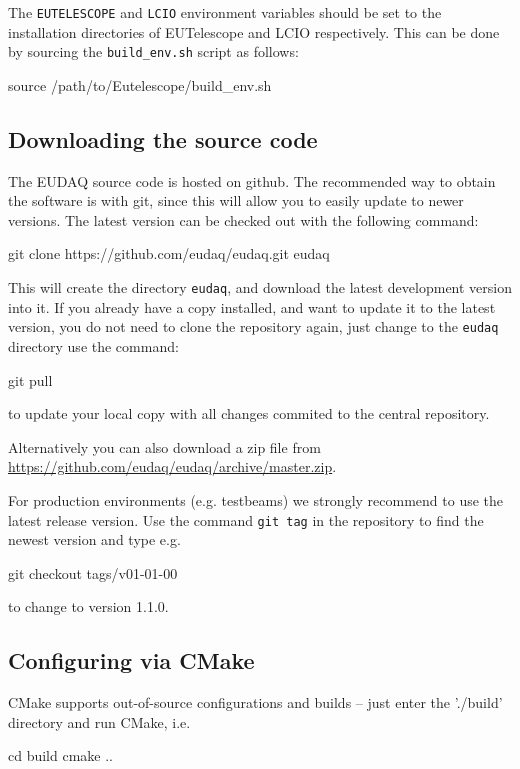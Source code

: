 The \texttt{EUTELESCOPE} and \texttt{LCIO} environment variables should be set to the
installation directories of EUTelescope and LCIO respectively.
This can be done by sourcing the \texttt{build\_env.sh} script as follows:
\begin{listing}[mybash]
source /path/to/Eutelescope/build_env.sh
\end{listing}

\subsection{Downloading the source code}
The EUDAQ source code is hosted on github. The recommended way to obtain the software is with git,
since this will allow you to easily update to newer versions.
The latest version can be checked out with the following command:
\begin{listing}[mybash]
git clone https://github.com/eudaq/eudaq.git eudaq
\end{listing}

This will create the directory \texttt{eudaq}, and download the latest
development version into it. 
If you already have a copy installed, and want to update it to the
latest version, you do not need to clone the repository again, just change to the \texttt{eudaq} directory use the command:
\begin{listing}[mybash]
git pull
\end{listing}
to update your local copy with all changes commited to the central repository.

Alternatively you can also download a zip file from
\url{https://github.com/eudaq/eudaq/archive/master.zip}.

For production environments (e.g. testbeams) we strongly recommend to
use the latest release version. Use the command \texttt{git tag} in
the repository to find the newest version and type e.g. 
\begin{listing}[mybash]
git checkout tags/v01-01-00
\end{listing}
to change to version 1.1.0.

\subsection{Configuring via CMake}
CMake supports out-of-source configurations and builds -- just enter
the './build' directory and run CMake, i.e.
\begin{listing}[mybash]
cd build
cmake ..
\end{listing}

